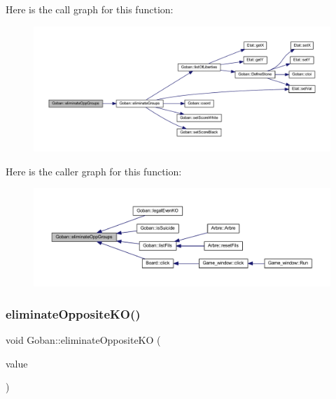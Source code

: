 Here is the call graph for this function\+:
\nopagebreak
\begin{figure}[H]
\begin{center}
\leavevmode
\includegraphics[width=350pt]{class_goban_a7858b815885e4af36f05f9d26182cb07_cgraph}
\end{center}
\end{figure}
Here is the caller graph for this function\+:
\nopagebreak
\begin{figure}[H]
\begin{center}
\leavevmode
\includegraphics[width=350pt]{class_goban_a7858b815885e4af36f05f9d26182cb07_icgraph}
\end{center}
\end{figure}
\mbox{\label{class_goban_a6c4b62a9469b3876d250ab94bcd562e5}} 
\subsubsection{\texorpdfstring{eliminate\+Opposite\+K\+O()}{eliminateOppositeKO()}}
{\footnotesize\ttfamily void Goban\+::eliminate\+Opposite\+KO (\begin{DoxyParamCaption}\item[{const \hyperlink{class_etat_af3ddb2296ffc379b7f3ad2bf832f294e}{Etat\+::\+V\+AL} \&}]{value }\end{DoxyParamCaption})}

